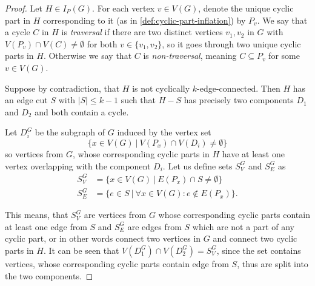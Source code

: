 \documentclass[12pt, twoside]{book}
\begin{document}
\begin{proof}
	Let $H\in I_P(G)$. For each vertex $v\in V(G)$, denote the unique cyclic part in $H$ corresponding to it (as in \cref{def:cyclic-part-inflation}) by $P_v$. We say that a cycle $C$ in $H$ is \textit{traversal} if there are two distinct vertices $v_1,v_2$ in $G$ with $V(P_v)\cap V(C)\neq \emptyset$ for both $v\in\{v_1,v_2\}$, so it goes through two unique cyclic parts in $H$. Otherwise we say that $C$ is \textit{non-traversal}, meaning $C\subseteq P_v$ for some $v\in V(G)$.
	
	Suppose by contradiction, that $H$ is not cyclically $k$-edge-connected. Then $H$ has an edge cut $S$ with $|S|\leq k-1$ such that $H-S$ has precisely two components $D_1$ and $D_2$ and both contain a cycle.
	
	Let $D_i^G$ be the subgraph of $G$ induced by the vertex set $$\{x\in V(G)~|~ V(P_x)\cap V(D_i)\neq \emptyset\}$$
	so vertices from $G$, whose corresponding cyclic parts in $H$ have at least one vertex overlapping with the component $D_i$. Let us define sets $S_V^G$ and $S_E^G$ as
	\begin{align*}
		S_V^G &= \{x\in V(G) ~|~ E(P_x)\cap S\neq \emptyset\} \\
		S_E^G &= \{e\in S ~|~ \forall x\in V(G): e\notin E(P_x) \}.
	\end{align*}
	
	This means, that $S_V^G$ are vertices from $G$ whose corresponding cyclic parts contain at least one edge from $S$ and $S_E^G$ are edges from $S$ which are not a part of any cyclic part, or in other words connect two vertices in $G$ and connect two cyclic parts in $H$. It can be seen that ${V(D_1^G)\cap V(D_2^G)=S_V^G}$, since the set contains vertices, whose corresponding cyclic parts contain edge from $S$, thus are split into the two components.
	

\end{proof}
\end{document}
